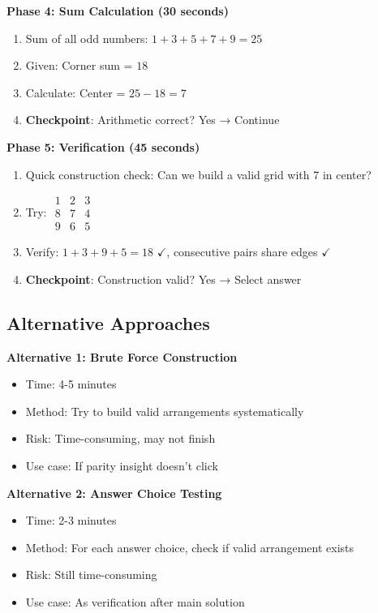 \documentclass[11pt]{article}
\begin{document}
\begin{roadmapbox}
\textbf{Phase 4: Sum Calculation (30 seconds)}
\begin{enumerate}[leftmargin=*]
    \item Sum of all odd numbers: $1+3+5+7+9=25$
    \item Given: Corner sum = $18$
    \item Calculate: Center = $25-18=7$
    \item \textbf{Checkpoint}: Arithmetic correct? Yes → Continue
\end{enumerate}

\textbf{Phase 5: Verification (45 seconds)}
\begin{enumerate}[leftmargin=*]
    \item Quick construction check: Can we build a valid grid with 7 in center?
    \item Try: $\begin{array}{ccc} 1 & 2 & 3 \\ 8 & 7 & 4 \\ 9 & 6 & 5 \end{array}$
    \item Verify: $1+3+9+5=18$ $\checkmark$, consecutive pairs share edges $\checkmark$
    \item \textbf{Checkpoint}: Construction valid? Yes → Select answer
\end{enumerate}

\subsection*{Alternative Approaches}

\textbf{Alternative 1: Brute Force Construction}
\begin{itemize}[leftmargin=*]
    \item Time: 4-5 minutes
    \item Method: Try to build valid arrangements systematically
    \item Risk: Time-consuming, may not finish
    \item Use case: If parity insight doesn't click
\end{itemize}

\textbf{Alternative 2: Answer Choice Testing}
\begin{itemize}[leftmargin=*]
    \item Time: 2-3 minutes
    \item Method: For each answer choice, check if valid arrangement exists
    \item Risk: Still time-consuming
    \item Use case: As verification after main solution
\end{itemize}


\end{roadmapbox}
\end{document}
